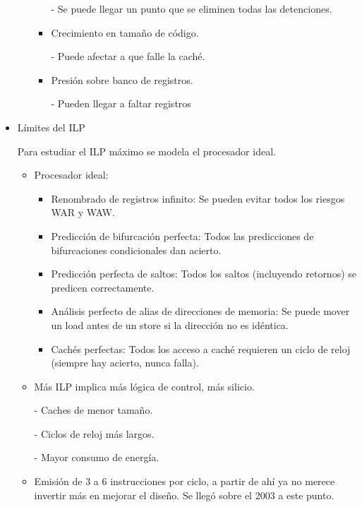 \documentclass[12pt, twoside, openright]{report} %
\begin{document}
\begin{itemize}
\begin{itemize}
\begin{itemize}
    - Se puede llegar un punto que se eliminen todas las detenciones.
    \item Crecimiento en tamaño de código.
    
    - Puede afectar a que falle la caché.
    \item Presión sobre banco de registros.
    
    - Pueden llegar a faltar registros
  \end{itemize}
      
\end{itemize}
    \pagebreak

\item Límites del ILP 

Para estudiar el ILP máximo se modela el procesador
ideal.
\begin{itemize}
  \item Procesador ideal:
\begin{itemize}
  \item Renombrado de registros infinito: Se pueden evitar
todos los riesgos WAR y WAW.
  \item Predicción de bifurcación perfecta: Todos las
predicciones de bifurcaciones condicionales dan acierto.
  \item Predicción perfecta de saltos: Todos los saltos
(incluyendo retornos) se predicen correctamente.
  \item Análisis perfecto de alias de direcciones de memoria:
  Se puede mover un load antes de un store si la dirección
no es idéntica.
  \item Cachés perfectas: Todos los acceso a caché requieren un
ciclo de reloj (siempre hay acierto, nunca falla).
\end{itemize}
\end{itemize}


  \begin{itemize}
  \item Más ILP implica más lógica de control, más silicio.
       
        - Caches de menor tamaño.

        - Ciclos de reloj más largos.

        - Mayor consumo de energía.
  \item Emisión de 3 a 6 instrucciones por ciclo, a partir de ahí ya no merece invertir más en mejorar el diseño. Se llegó sobre el 2003 a este punto.
  \end{itemize}
\end{itemize}
\end{document}
